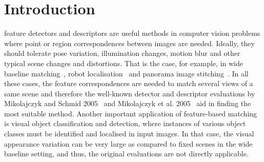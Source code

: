\documentclass[journal]{IEEEtran}
\begin{document}
%
\IEEEpeerreviewmaketitle



%
\section{Introduction}
%
feature detectors and descriptors are useful methods
in computer vision problems where point or region correspondences between images are needed.
Ideally, they should tolerate pose variation, illumination changes,
motion blur and other typical scene changes and distortions. That is
the case, for example, in
wide baseline matching~\cite{TuyGoo:2004}, robot
localisation~\cite{SeLowLit:2002} and panorama image
stitching~\cite{BroLow:2003}. In all these cases, 
the feature correspondences are needed to match several views of
a same scene and therefore the well-known detector and descriptor
evaluations by Mikolajczyk and Schmid 2005~\cite{MikTuySch:2005} and
Mikolajczyk et al. 2005~\cite{MikSch:2005} aid in finding the
most suitable method. Another important application of
feature-based matching is visual object classification and
detection, where instances of various object classes must be identified
and localised in input images. In that case, the visual appearance
variation can be very large as compared to fixed scenes in the wide baseline setting, and thus,
the original evaluations are not directly applicable.
\end{document}
